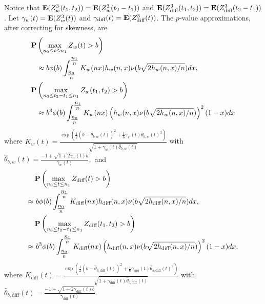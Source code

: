 \documentclass[arxiv, preprint]{imsart}
\numberwithin{equation}{section}
\theoremstyle{plain}
\begin{document}
Notice that $ \mathbf{E}(Z^3_w(t_1,t_2)) = \mathbf{E}(Z^3_w(t_2 - t_1))$ and 
$ \mathbf{E}(Z^3_\text{diff}(t_1,t_2))=\mathbf{E}(Z^3_\text{diff}(t_2 - t_1)) $.  Let  $\gamma_w(t) = \mathbf{E}(Z^3_w(t))$ and $\gamma_\text{diff}(t) = \mathbf{E}(Z^3_\text{diff}(t))$.
The $p$-value approximations, after correcting for skewness, are
\begin{align}
\label{eq:Zw_pvalue_skew} 
 \mathbf{P} & \left(\max_{n_0 \le t \le n_1} Z_w(t) > b \right) \\ 
 & \approx b \phi(b) \int_{\tfrac{n_0}{n}}^{\tfrac{n_1}{n}} K_w(nx)h_w(n,x) \nu (b \sqrt{2h_w(n,x)/n})dx,  \nonumber \\
 \mathbf{P} &  \left(\max_{n_0 \le t_2 -t_1 \le n_1} Z_w(t_1,t_2) > b \right) \label{eq:Zw2_pvalue_skew} \\ 
&  \approx b^3 \phi(b) \int_{\tfrac{n_0}{n}}^{\tfrac{n_1}{n}} K_w(nx) \left( h_w(n,x) \nu (b \sqrt{2h_w(n,x)/n}) \right ) ^2 (1-x)dx \nonumber
\end{align}
where $ K_w(t) = \frac{\exp \left( \frac{1}{2} (b - \hat{\theta}_{b,w}(t))^2 + \frac{1}{6} \gamma_w(t) \hat{\theta}_{b,w}(t)^3 \right )}{\sqrt{1+\gamma_w(t)\hat{\theta}_{b,w}(t)}}$
with $ \hat{\theta}_{b,w}(t) = \frac{-1 + \sqrt{1+2 \gamma_w(t)b}}{\gamma_w(t)}, $
and
\allowdisplaybreaks
\begin{align}
 & \mathbf{P} \left(\max_{n_0 \le t \le n_1} Z_\text{diff}(t) > b \right) \label{eq:Zdiff_pvalue_skew} \\
    \approx\, &\, b \phi(b) \int_{\tfrac{n_0}{n}}^{\tfrac{n_1}{n}} K_\text{diff}(nx)h_\text{diff}(n,x) \nu (b \sqrt{2h_\text{diff}(n,x)/n})dx,   \nonumber \\
 & \mathbf{P} \left(\max_{n_0 \le t_2 -t_1 \le n_1} Z_\text{diff}(t_1,t_2) > b \right)  \label{eq:Zdiff2_pvalue_skew} \\
  \approx\, &\, b^3 \phi(b) \int_{\tfrac{n_0}{n}}^{\tfrac{n_1}{n}} K_\text{diff}(nx) \left( h_\text{diff}(n,x) \nu (b \sqrt{2h_\text{diff}(n,x)/n}) \right ) ^2 (1-x)dx, \nonumber 
\end{align}
where $ K_\text{diff}(t) = \frac{\exp \left( \frac{1}{2} (b - \hat{\theta}_{b,\text{diff}}(t))^2 + \frac{1}{6} \gamma_\text{diff}(t) \hat{\theta}_{b,\text{diff}}(t)^3 \right )}{\sqrt{1+\gamma_\text{diff}(t)\hat{\theta}_{b,\text{diff}}(t)}}$
with $  \hat{\theta}_{b,\text{diff}}(t) = \frac{-1 + \sqrt{1+2 \gamma_\text{diff}(t)b}}{\gamma_\text{diff}(t)}. $ 
\end{document}
